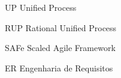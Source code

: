 \begin{siglas}
  \item[UP] Unified Process
  \item[RUP] Rational Unified Process
  \item[SAFe] Scaled Agile Framework
  \item[ER] Engenharia de Requisitos
\end{siglas}
